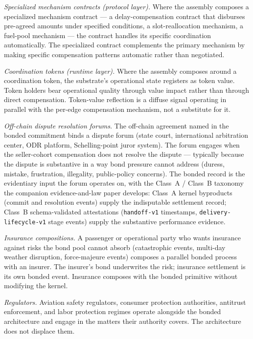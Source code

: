 \documentclass[11pt,a4paper]{article}
\theoremstyle{definition}
\theoremstyle{remark}
\begin{document}
\emph{Specialized mechanism contracts (protocol layer).} Where
the assembly composes a specialized mechanism contract --- a
delay-compensation contract that disburses pre-agreed amounts
under specified conditions, a slot-reallocation mechanism, a
fuel-pool mechanism --- the contract handles its specific
coordination automatically. The specialized contract complements
the primary mechanism by making specific compensation patterns
automatic rather than negotiated.

\emph{Coordination tokens (runtime layer).} Where the assembly
composes around a coordination token, the substrate's operational
state registers as token value. Token holders bear operational
quality through value impact rather than through direct
compensation. Token-value reflection is a diffuse signal
operating in parallel with the per-edge compensation mechanism,
not a substitute for it.

\emph{Off-chain dispute resolution forums.} The off-chain
agreement named in the bonded commitment binds a dispute forum
(state court, international arbitration center, ODR platform,
Schelling-point juror system). The forum engages when the
seller-cohort compensation does not resolve the dispute ---
typically because the dispute is substantive in a way bond
pressure cannot address (duress, mistake, frustration,
illegality, public-policy concerns). The bonded record is the
evidentiary input the forum operates on, with the Class~A /
Class~B taxonomy the companion evidence-and-law paper develops:
Class~A kernel byproducts (commit and resolution events) supply
the indisputable settlement record; Class~B schema-validated
attestations (\texttt{handoff-v1} timestamps,
\texttt{delivery-lifecycle-v1} stage events) supply the
substantive performance evidence.

\emph{Insurance compositions.} A passenger or operational party
who wants insurance against risks the bond pool cannot absorb
(catastrophic events, multi-day weather disruption, force-majeure
events) composes a parallel bonded process with an insurer. The
insurer's bond underwrites the risk; insurance settlement is its
own bonded event. Insurance composes with the bonded primitive
without modifying the kernel.

\emph{Regulators.} Aviation safety regulators, consumer protection
authorities, antitrust enforcement, and labor protection regimes
operate alongside the bonded architecture and engage in the
matters their authority covers. The architecture does not
displace them.
\end{document}
